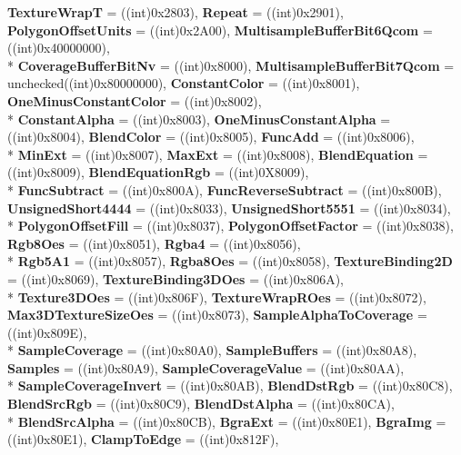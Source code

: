 \begin{DoxyCompactItemize}
{\bfseries Texture\-Wrap\-T} = ((int)0x2803), 
{\bfseries Repeat} = ((int)0x2901), 
{\bfseries Polygon\-Offset\-Units} = ((int)0x2\-A00), 
{\bfseries Multisample\-Buffer\-Bit6\-Qcom} = ((int)0x40000000), 
\\*
{\bfseries Coverage\-Buffer\-Bit\-Nv} = ((int)0x8000), 
{\bfseries Multisample\-Buffer\-Bit7\-Qcom} = unchecked((int)0x80000000), 
{\bfseries Constant\-Color} = ((int)0x8001), 
{\bfseries One\-Minus\-Constant\-Color} = ((int)0x8002), 
\\*
{\bfseries Constant\-Alpha} = ((int)0x8003), 
{\bfseries One\-Minus\-Constant\-Alpha} = ((int)0x8004), 
{\bfseries Blend\-Color} = ((int)0x8005), 
{\bfseries Func\-Add} = ((int)0x8006), 
\\*
{\bfseries Min\-Ext} = ((int)0x8007), 
{\bfseries Max\-Ext} = ((int)0x8008), 
{\bfseries Blend\-Equation} = ((int)0x8009), 
{\bfseries Blend\-Equation\-Rgb} = ((int)0\-X8009), 
\\*
{\bfseries Func\-Subtract} = ((int)0x800\-A), 
{\bfseries Func\-Reverse\-Subtract} = ((int)0x800\-B), 
{\bfseries Unsigned\-Short4444} = ((int)0x8033), 
{\bfseries Unsigned\-Short5551} = ((int)0x8034), 
\\*
{\bfseries Polygon\-Offset\-Fill} = ((int)0x8037), 
{\bfseries Polygon\-Offset\-Factor} = ((int)0x8038), 
{\bfseries Rgb8\-Oes} = ((int)0x8051), 
{\bfseries Rgba4} = ((int)0x8056), 
\\*
{\bfseries Rgb5\-A1} = ((int)0x8057), 
{\bfseries Rgba8\-Oes} = ((int)0x8058), 
{\bfseries Texture\-Binding2\-D} = ((int)0x8069), 
{\bfseries Texture\-Binding3\-D\-Oes} = ((int)0x806\-A), 
\\*
{\bfseries Texture3\-D\-Oes} = ((int)0x806\-F), 
{\bfseries Texture\-Wrap\-R\-Oes} = ((int)0x8072), 
{\bfseries Max3\-D\-Texture\-Size\-Oes} = ((int)0x8073), 
{\bfseries Sample\-Alpha\-To\-Coverage} = ((int)0x809\-E), 
\\*
{\bfseries Sample\-Coverage} = ((int)0x80\-A0), 
{\bfseries Sample\-Buffers} = ((int)0x80\-A8), 
{\bfseries Samples} = ((int)0x80\-A9), 
{\bfseries Sample\-Coverage\-Value} = ((int)0x80\-A\-A), 
\\*
{\bfseries Sample\-Coverage\-Invert} = ((int)0x80\-A\-B), 
{\bfseries Blend\-Dst\-Rgb} = ((int)0x80\-C8), 
{\bfseries Blend\-Src\-Rgb} = ((int)0x80\-C9), 
{\bfseries Blend\-Dst\-Alpha} = ((int)0x80\-C\-A), 
\\*
{\bfseries Blend\-Src\-Alpha} = ((int)0x80\-C\-B), 
{\bfseries Bgra\-Ext} = ((int)0x80\-E1), 
{\bfseries Bgra\-Img} = ((int)0x80\-E1), 
{\bfseries Clamp\-To\-Edge} = ((int)0x812\-F), 

\end{DoxyCompactItemize}
